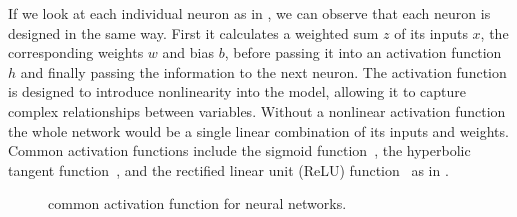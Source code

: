 If we look at each individual neuron as in , we can observe that each neuron is designed in the same way. First it calculates a weighted sum $z$ of its inputs $x$, the corresponding weights $w$ and bias $b$, before passing it into an activation function $h$ and finally passing the information to the next neuron. The activation function is designed to introduce nonlinearity into the model, allowing it to capture complex relationships between variables. Without a nonlinear activation function the whole network would be a single linear combination of its inputs and weights. Common activation functions include the sigmoid function~\cite{DL_ActivationFunctions}, the hyperbolic tangent function~\cite{DL_ActivationFunctions}, and the rectified linear unit (ReLU) function~\cite{DL_ReLU} as in .
\begin{figure}
    \begin{center}
        \hfill
        \hfill
    \end{center}
    \caption[common activation functions in a neural network]{common activation function for neural networks.}
    \label{fig:activation_function}
\end{figure}
